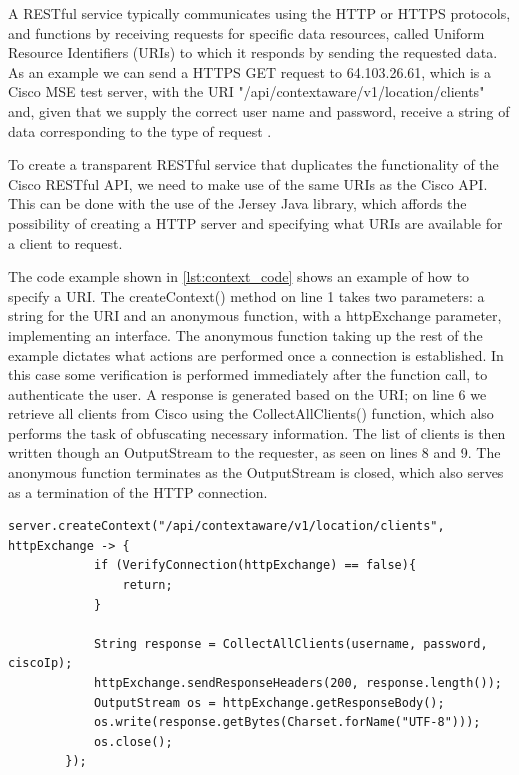 A RESTful service typically communicates using the HTTP or HTTPS protocols, and functions by receiving requests for specific data resources, called Uniform Resource Identifiers (URIs) to which it responds by sending the requested data. As an example we can send a HTTPS GET request to 64.103.26.61, which is a Cisco MSE test server, with the URI "/api/contextaware/v1/location/clients" and, given that we supply the correct user name and password, receive a string of data corresponding to the type of request \cite{restful_oracle}.

To create a transparent RESTful service that duplicates the functionality of the Cisco RESTful API, we need to make use of the same URIs as the Cisco API\cite{cisco_mse_api}. This can be done with the use of the Jersey Java library, which affords the possibility of creating a HTTP server and specifying what URIs are available for a client to request.

The code example shown in \cref{lst:context_code} shows an example of how to specify a URI. The createContext() method on line 1 takes two parameters: a string for the URI and an anonymous function, with a httpExchange parameter, implementing an interface. The anonymous function taking up the rest of the example dictates what actions are performed once a connection is established. In this case some verification is performed immediately after the function call, to authenticate the user. A response is generated based on the URI; on line 6 we retrieve all clients from Cisco using the CollectAllClients() function, which also performs the task of obfuscating necessary information. The list of clients is then written though an OutputStream to the requester, as seen on lines 8 and 9. The anonymous function terminates as the OutputStream is closed, which also serves as a termination of the HTTP connection. 

\begin{lstlisting}[caption={Adding a URI},label={lst:context_code},language=inc_Java]
server.createContext("/api/contextaware/v1/location/clients", httpExchange -> {
            if (VerifyConnection(httpExchange) == false){
                return;
            }

            String response = CollectAllClients(username, password, ciscoIp);
            httpExchange.sendResponseHeaders(200, response.length());
            OutputStream os = httpExchange.getResponseBody();
            os.write(response.getBytes(Charset.forName("UTF-8")));
            os.close();
        });
\end{lstlisting}

